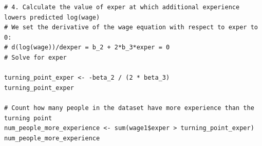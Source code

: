 \documentclass[12pt]{article}
\begin{document}
\begin{enumerate}
{\begin{verbatim}
# 4. Calculate the value of exper at which additional experience lowers predicted log(wage)
# We set the derivative of the wage equation with respect to exper to 0:
# d(log(wage))/dexper = b_2 + 2*b_3*exper = 0
# Solve for exper

turning_point_exper <- -beta_2 / (2 * beta_3)
turning_point_exper

# Count how many people in the dataset have more experience than the turning point
num_people_more_experience <- sum(wage1$exper > turning_point_exper)
num_people_more_experience
\end{verbatim}


}




    
\end{enumerate}
\end{document}
